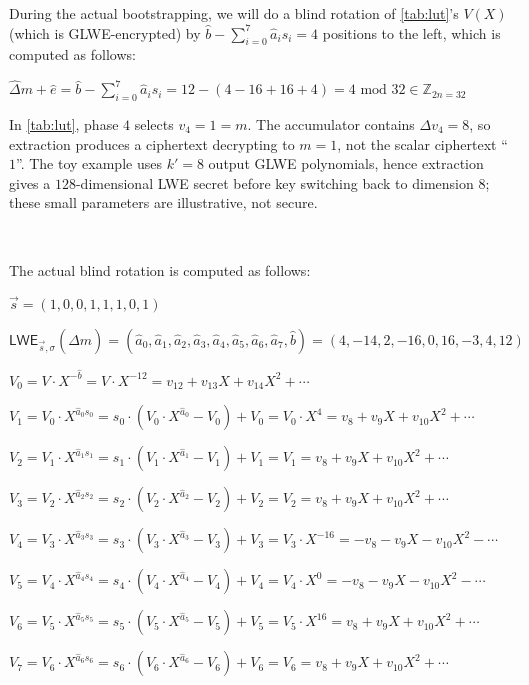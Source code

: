\begin{enumerate}
During the actual bootstrapping, we will do a blind rotation of \autoref{tab:lut}'s $V(X)$ (which is GLWE-encrypted) by $\hat{b} - \sum\limits_{i=0}^{7}\hat{a}_is_i = 4$ positions to the left, which is computed as follows:

$\hat\Delta m + \hat e = \hat{b} - \sum\limits_{i=0}^{7}\hat{a}_is_i = 12 - (4 - 16 + 16 + 4) = 4 \text{ mod 32} \in \mathbb{Z}_{2n=32}$ 


In \autoref{tab:lut}, phase $4$ selects $v_4=1=m$. The accumulator contains $\Delta v_4=8$, so extraction produces a ciphertext decrypting to $m=1$, not the scalar ciphertext ``$1$''. The toy example uses $k'=8$ output GLWE polynomials, hence extraction gives a $128$-dimensional LWE secret before key switching back to dimension $8$; these small parameters are illustrative, not secure.



$ $

The actual blind rotation is computed as follows:

$\vec{s} = (1, 0, 0, 1, 1, 1, 0, 1)$

$\textsf{LWE}_{\vec{s}, \sigma}(\hat{\Delta}m) = (\hat{a}_0, \hat{a}_1, \hat{a}_2, \hat{a}_3, \hat{a}_4, \hat{a}_5, \hat{a}_6, \hat{a}_7, \hat{b}) =  (4, -14, 2, -16, 0, 16, -3, 4, 12)$

$V_0 = V \cdot X^{-\hat{b}} = V \cdot X^{-12} = v_{12} + v_{13}X + v_{14}X^2 + \cdots $

$V_1 = V_0 \cdot X^{\hat{a}_0s_0} = s_0 \cdot (V_0 \cdot X^{\hat{a}_0} - V_0) + V_0 = V_0 \cdot X^{4} = v_{8} + v_{9}X + v_{10}X^2 + \cdots$ 

$V_2 = V_1 \cdot X^{\hat{a}_1s_1} = s_1 \cdot (V_1 \cdot X^{\hat{a}_1} - V_1) + V_1 = V_1 = v_{8} + v_{9}X + v_{10}X^2 + \cdots$

$V_3 = V_2 \cdot X^{\hat{a}_2s_2} = s_2 \cdot (V_2 \cdot X^{\hat{a}_2} - V_2) + V_2 = V_2 = v_{8} + v_{9}X + v_{10}X^2 + \cdots$

$V_4 = V_3 \cdot X^{\hat{a}_3s_3} = s_3 \cdot (V_3 \cdot X^{\hat{a}_3} - V_3) + V_3 = V_3 \cdot X^{-16} = -v_{8} - v_{9}X - v_{10}X^2 - \cdots$

$V_5 = V_4 \cdot X^{\hat{a}_4s_4} = s_4 \cdot (V_4 \cdot X^{\hat{a}_4} - V_4) + V_4 = V_4 \cdot X^{0} = -v_{8} - v_{9}X - v_{10}X^2 - \cdots$

$V_6 = V_5 \cdot X^{\hat{a}_5s_5} = s_5 \cdot (V_5 \cdot X^{\hat{a}_5} - V_5) + V_5 = V_5 \cdot X^{16} = v_{8} + v_{9}X + v_{10}X^2 + \cdots$

$V_7 = V_6 \cdot X^{\hat{a}_6s_6} = s_6 \cdot (V_6 \cdot X^{\hat{a}_6} - V_6) + V_6 = V_6 = v_{8} + v_{9}X + v_{10}X^2 + \cdots$


\end{enumerate}
